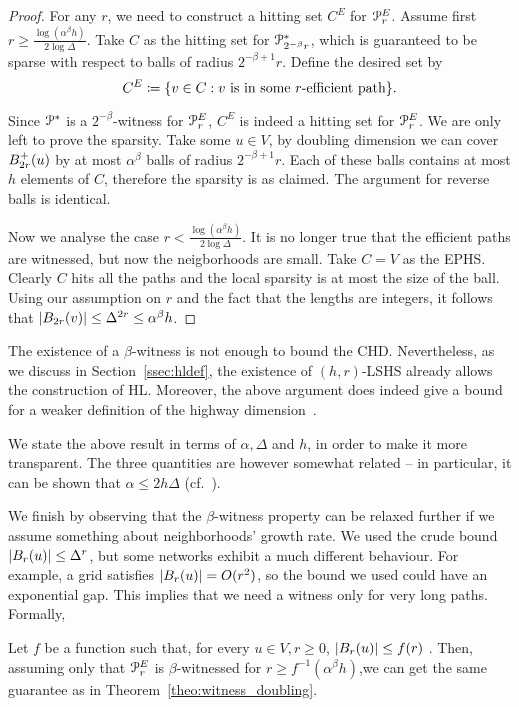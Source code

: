 \begin{proof}
For any $r$, we need to construct a hitting set $C^E$ for $\mathcal{P}^E_r$.
Assume first $r\geq \frac{\log(\alpha^\beta h)}{2\log\Delta}$.
Take $C$ as the hitting set for $\mathcal{P}^*_{2^{-\beta}r}$, which is guaranteed to be sparse with respect to balls of radius $2^{-\beta+1}r$.
Define the desired set by
\[
C^E\coloneqq\{v\in C: v \text{ is in some $r$-efficient path} \}.
\]

Since $\mathcal{P}^*$ is a $2^{-\beta}$-witness for $\mathcal{P}^E_r$, $C^E$ is indeed a hitting set for $\mathcal{P}^E_r$.
We are only left to prove the sparsity.
Take some $u\in V$, by doubling dimension we can cover $B^+_{2r}(u)$ by at most $\alpha^\beta$ balls of radius $2^{-\beta+1}r$.
Each of these balls contains at most $h$ elements of $C$, therefore the sparsity is as claimed.
The argument for reverse balls is identical.

Now we analyse the case $r< \frac{\log(\alpha^\beta h)}{2\log\Delta}$.
It is no longer true that the efficient paths are witnessed, but now the neigborhoods are small.
Take $C=V$ as the EPHS.
Clearly $C$ hits all the paths and the local sparsity is at most the size of the ball.
Using our assumption on $r$ and the fact that the lengths are integers, it follows that $\lvert B_{2r}(v)\rvert\leq\Delta^{2r}\leq\alpha^\beta h$. 
\end{proof}
\begin{remark}
The existence of a $\beta$-witness is not enough to bound the CHD. Nevertheless, as we discuss in Section~\ref{ssec:hldef}, the existence of $(h,r)$-LSHS already allows the construction of HL. Moreover, the above argument does indeed give a bound for a weaker definition of the highway dimension~\cite{highway2010}.
\end{remark}
\begin{remark}
We state the above result in terms of $\alpha, \Delta$ and $h$, in order to make it more transparent. The three quantities are however somewhat related -- in particular, it can be shown that $\alpha\leq 2h\Delta$ (cf.~\cite{skeleton}).
\end{remark}

We finish by observing that the $\beta$-witness property can be relaxed further if we assume something about neighborhoods' growth rate.
We used the crude bound $\lvert B_r(u)\rvert\leq \Delta^r$, but some networks exhibit a much different behaviour.
For example, a grid satisfies  $\lvert B_r(u)\rvert=O(r^2)$, so the bound we used could have an exponential gap.
This implies that we need a witness only for very long paths.
Formally,

\begin{corollary}
Let $f$ be a function such that, for every $u\in V, r\geq 0$, $\lvert B_r(u)\rvert\leq f(r)$ .
Then, assuming only that $\mathcal{P}^E_r$ is $\beta$-witnessed for $r\geq f^{-1}(\alpha^\beta h)$,we can get the same guarantee as in Theorem~\ref{theo:witness_doubling}.
\end{corollary}

